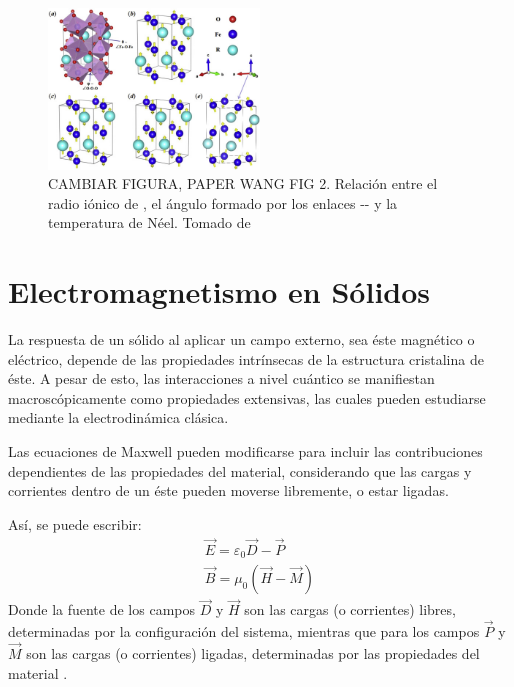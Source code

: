 \documentclass[../main.tex]{subfiles}
\begin{document}
\begin{figure}[H]
    \centering
    \includegraphics[width=0.5\textwidth]{fig/estructura.jpg}
    \caption{CAMBIAR FIGURA, PAPER WANG FIG 2. Relación entre el radio iónico de , el ángulo formado por los enlaces -- y la temperatura de Néel. Tomado de \cite{Wang2019}}
    \label{fig:neelradio}
\end{figure}

\section{Electromagnetismo en Sólidos}
La respuesta de un sólido al aplicar un campo externo, sea éste magnético o eléctrico, depende de las propiedades intrínsecas de la estructura cristalina de éste. A pesar de esto, las interacciones a nivel cuántico se manifiestan macroscópicamente como propiedades extensivas, las cuales pueden estudiarse mediante la electrodinámica clásica.

Las ecuaciones de Maxwell pueden modificarse para incluir las contribuciones dependientes de las propiedades del material, considerando que las cargas y corrientes dentro de un éste pueden moverse libremente, o estar ligadas.

Así, se puede escribir:
\begin{equation}
    \begin{split}
        \vec{E}=\varepsilon_0\vec{D}-\vec{P}\\
        \vec{B}=\mu_0(\vec{H}-\vec{M})
    \end{split}  
    \label{eq:maxwellmacro}
\end{equation}
Donde la fuente de los campos $\vec{D}$ y $\vec{H}$ son las cargas (o corrientes) libres, determinadas por la configuración del sistema, mientras que para los campos $\vec{P}$ y $\vec{M}$ son las cargas (o corrientes) ligadas, determinadas por las propiedades del material \cite{griffiths2023introduction}.
\end{document}
